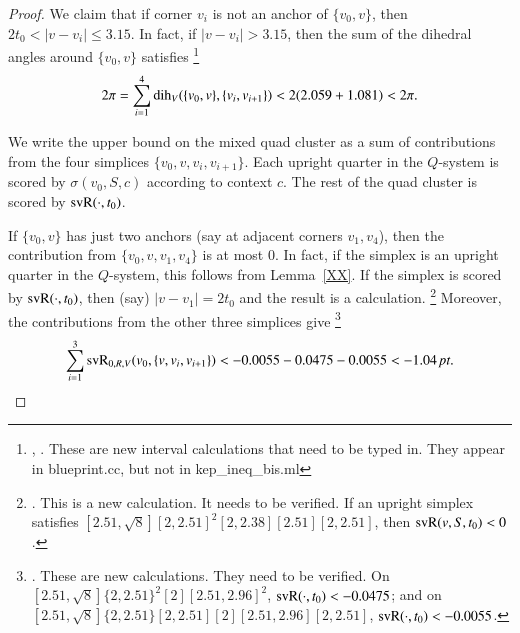 \begin{proof}
We claim that if corner $v_i$ is not an anchor of $\{v_0,v\}$,
then $2t_0 < |v-v_i| \le 3.15$.  In fact, if $|v-v_i| > 3.15$,
then the sum of the dihedral angles around $\{v_0,v\}$ satisfies%
\footnote{, .  
These are new interval calculations 
  that need to be typed in.  They appear in blueprint.cc, but not in kep\_ineq\_bis.ml}
 $$
 2\pi = \sum_{i=1}^4 \operatorname{dih}_V(\{v_0,v\},\{v_i,v_{i+1}\}) < 2(2.059+1.081) < 2\pi.
 $$




We write the upper bound on the mixed quad cluster
as a sum of contributions from the four simplices
$\{v_0,v,v_i,v_{i+1}\}$.  
Each upright quarter in the $Q$-system is scored by $\sigma(v_0,S,c)$ according to context $c$.
The rest of the quad cluster is scored by ${\operatorname{svR}}(\cdot,t_0)$.  



If $\{v_0,v\}$ has just two anchors (say at adjacent corners $v_1,v_4$),
then the contribution from $\{v_0,v,v_1,v_4\}$ is at most $0$.  In
fact, if the simplex is an upright quarter in the $Q$-system, this
follows from Lemma~\ref{XX}.  If the simplex is scored by ${\operatorname{svR}}(\cdot,t_0)$,
then (say) $|v-v_1|=2t_0$ and the result is a calculation.%
\footnote{.  This is a new calculation.  
It needs to be verified.  If an upright
simplex satisfies $[2.51,\sqrt8][2,2.51]^2[2,2.38][2.51][2,2.51]$,
then ${\operatorname{svR}}(v,S,t_0) < 0$.}  Moreover, the contributions from the other
three simplices give%
\footnote{. These are new calculations.  They need
to be verified.  On
$[2.51,\sqrt8]\{2,2.51\}^2[2][2.51,2.96]^2$, ${\operatorname{svR}}(\cdot,t_0) < -0.0475$; and
on $[2.51,\sqrt8]\{2,2.51\}[2,2.51][2][2.51,2.96][2,2.51]$,
   ${\operatorname{svR}}(\cdot,t_0) < -0.0055$.
}
 $$\sum_{i=1}^3{\operatorname{svR}}_{0,R,V}(v_0,\{v,v_i,v_{i+1}\}) <
   -0.0055 - 0.0475 - 0.0055 < -1.04\,\hbox{\it pt}.$$


\end{proof}
